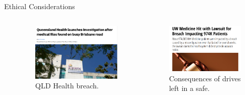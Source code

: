 \documentclass[aspectratio=1610, 11pt]{beamer} %
\begin{document}
\begin{frame}{Ethical Considerations}
\begin{columns}[t]
\begin{column}{.35\textwidth}
\begin{itemize}
    
\end{itemize}
\end{column}
\begin{column}{.3\textwidth}
\begin{figure}
    \centering
    \includegraphics[width=\linewidth]{figures/qld-breach.png}
    \caption{QLD Health breach. \parencite{Bavas2019-xc}}
\end{figure}
\end{column}
\begin{column}{.3\textwidth}

\begin{figure}
    \centering
    \includegraphics[width=\linewidth]{figures/uw.png}
    \caption{Consequences of drives left in a safe. \parencite{Davis2020-jr}}
\end{figure}

\end{column}
\end{columns}



\end{frame}
\end{document}
